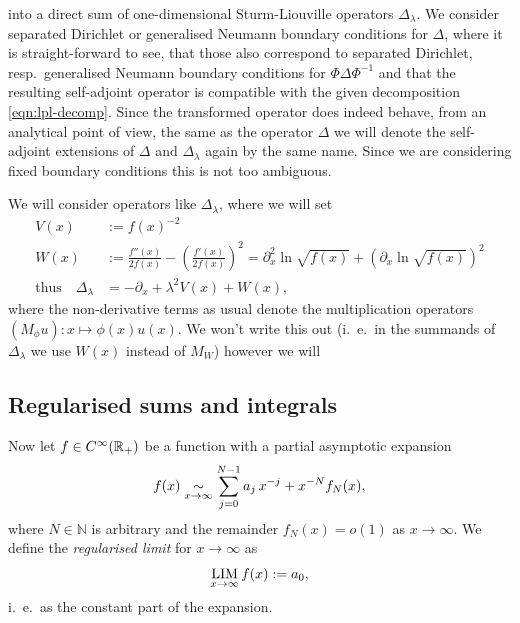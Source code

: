 into a direct sum of one-dimensional Sturm-Liouville operators $\Delta_\lambda$.
We consider separated Dirichlet or generalised Neumann boundary conditions for
$\Delta$, where it is straight-forward to see, that those also correspond to
separated Dirichlet, resp.\ generalised Neumann boundary conditions for
$\Phi\Delta\Phi^{-1}$ and that the resulting self-adjoint operator is compatible
with the given decomposition \eqref{eqn:lpl-decomp}. Since the transformed
operator does indeed behave, from an analytical point of view, the same as the
operator $\Delta$ we will denote the self-adjoint extensions of $\Delta$ and
$\Delta_\lambda$ again by the same name. Since we are considering fixed boundary
conditions this is not too ambiguous.

We will consider operators like $\Delta_\lambda$, where we will set
\begin{align}
  V(x) &:= f(x)^{-2} \\
  W(x) &:= \frac{f''(x)}{2f(x)} - \left(\frac{f'(x)}{2f(x)}\right)^2 =
  \partial_x^2 \ln\sqrt{f(x)} + \left(\partial_x \ln\sqrt{f(x)}\right)^2 \\
  \text{thus}\quad \Delta_\lambda &= -\partial_x + \lambda^2 V(x) + W(x),
\end{align}
where the non-derivative terms as usual denote the multiplication operators
$(M_\phi u)\colon x \mapsto \phi(x)u(x)$. We won't write this out (i.~e.\ in the
summands of $\Delta_\lambda$ we use $W(x)$ instead of $M_W$) however we will 

\subsection{Regularised sums and integrals}

Now let $f\in C^\infty_{}({\mathbb{R}_+})$ be a function with a partial asymptotic expansion
\begin{align*}
  f(x) \mathrel{\underset{x\to\infty}{\sim}} \sum_{j=0}^{N-1} a_{j}\,x^{-j} + x^{-N}f_N(x),
\end{align*}
where $N\in\mathbb{N}$ is arbitrary and the remainder $f_N(x) = o(1)$ as
$x\to\infty$. We define the \emph{regularised limit} for $x\to\infty$ as
\begin{align}
  \operatorname*{LIM}_{x\to\infty} f(x) := a_0,
\end{align}
i.~e.\ as the constant part of the expansion.

